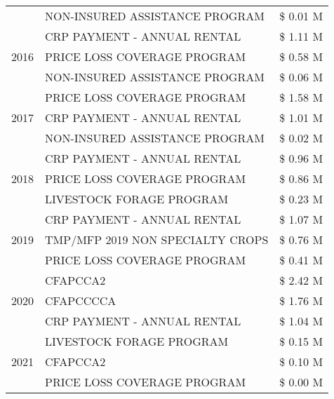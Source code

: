 \begin{tabular}{llr}
 & NON-INSURED ASSISTANCE PROGRAM & \$ 0.01 M \\
\cline{1-3}
\multirow[t]{3}{*}{2016} & CRP PAYMENT - ANNUAL RENTAL                   & \$ 1.11 M \\
 & PRICE LOSS COVERAGE PROGRAM                   & \$ 0.58 M \\
 & NON-INSURED ASSISTANCE PROGRAM                & \$ 0.06 M \\
\cline{1-3}
\multirow[t]{3}{*}{2017} & PRICE LOSS COVERAGE PROGRAM & \$ 1.58 M \\
 & CRP PAYMENT - ANNUAL RENTAL & \$ 1.01 M \\
 & NON-INSURED ASSISTANCE PROGRAM & \$ 0.02 M \\
\cline{1-3}
\multirow[t]{3}{*}{2018} & CRP PAYMENT - ANNUAL RENTAL & \$ 0.96 M \\
 & PRICE LOSS COVERAGE PROGRAM & \$ 0.86 M \\
 & LIVESTOCK FORAGE PROGRAM & \$ 0.23 M \\
\cline{1-3}
\multirow[t]{3}{*}{2019} & CRP PAYMENT - ANNUAL RENTAL & \$ 1.07 M \\
 & TMP/MFP 2019 NON SPECIALTY CROPS & \$ 0.76 M \\
 & PRICE LOSS COVERAGE PROGRAM & \$ 0.41 M \\
\cline{1-3}
\multirow[t]{3}{*}{2020} & CFAPCCA2 & \$ 2.42 M \\
 & CFAPCCCCA & \$ 1.76 M \\
 & CRP PAYMENT - ANNUAL RENTAL & \$ 1.04 M \\
\cline{1-3}
\multirow[t]{3}{*}{2021} & LIVESTOCK FORAGE PROGRAM & \$ 0.15 M \\
 & CFAPCCA2 & \$ 0.10 M \\
 & PRICE LOSS COVERAGE PROGRAM & \$ 0.00 M \\
\cline{1-3}
\bottomrule
\end{tabular}

